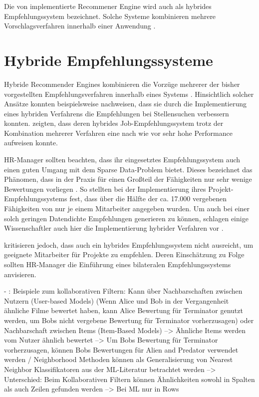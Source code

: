 Die von \textcite[S. 1]{semanticMatchmaking:2009} implementierte Recommener Engine wird auch als hybrides Empfehlungssystem bezeichnet. Solche Systeme kombinieren mehrere Vorschlagsverfahren innerhalb einer Anwendung \cite[S. 8]{malinowski:2008}.

\section{Hybride Empfehlungssysteme}
\label{ch:empfehlungssysteme:hybrideEmpfehlungssysteme}
Hybride Recommender Engines kombinieren die Vorzüge mehrerer der bisher vorgestellten Empfehlungsverfahren innerhalb eines Systems \cite[S. 8]{malinowski:2008}. Hinsichtlich solcher Ansätze konnten beispielsweise \textcite[S. 8]{combiningCbAndCFCostSensitiveApproach:2017} nachweisen, dass sie durch die Implementierung eines hybriden Verfahrens die Empfehlungen bei Stellensuchen verbessern konnten. \textcite[S. 16]{hybridImmunizing:2017} zeigten, dass deren hybrides Job-Empfehlungssystem trotz der Kombination mehrerer Verfahren eine nach wie vor sehr hohe Performance aufweisen konnte.

HR-Manager sollten beachten, dass ihr eingesetztes Empfehlungssystem auch einen guten Umgang mit dem Sparse Data-Problem bietet. Dieses bezeichnet das Phänomen, dass in der Praxis für einen Großteil der Fähigkeiten nur sehr wenige Bewertungen vorliegen \cite[S. 8]{recommenderSystems:2016}. So stellten \textcite[S. 3]{mitre:2014} bei der Implementierung ihres Projekt-Empfehlungssystems fest, dass über die Hälfte der ca. 17.000 vergebenen Fähigkeiten von nur je einem Mitarbeiter angegeben wurden. Um auch bei einer solch geringen Datendichte Empfehlungen generieren zu können, schlagen einige Wissenschaftler auch hier die Implementierung hybrider Verfahren vor \cite[S. 3]{weightedSimilarity:2015}.

\textcite[S. 1]{malinowski:2008} kritisieren jedoch, dass auch ein hybrides Empfehlungssystem nicht ausreicht, um geeignete Mitarbeiter für Projekte zu empfehlen. Deren Einschätzung zu Folge sollten HR-Manager die Einführung eines bilateralen Empfehlungssystems anvisieren.

\newpage
- \cite[S. 33]{recommenderSystems:2016}: Beispiele zum kollaborativen Filtern: Kann über Nachbarschaften zwischen Nutzern (User-based Models) (Wenn Alice und Bob in der Vergangenheit ähnliche Filme bewertet haben, kann Alice Bewertung für Terminator genutzt werden, um Bobs nicht vergebene Bewertung für Terminator vorherzusagen) oder Nachbarschaft zwischen Items (Item-Based Models) --> Ähnliche Items werden vom Nutzer ähnlich bewertet --> Um Bobs Bewertung für Terminator vorherzusagen, können Bobs Bewertungen für Alien and Predator verwendet werden / Neighborhood Methoden können als Generalisierung von Nearest Neighbor Klassifikatoren aus der ML-Literatur betrachtet werden --> Unterschied: Beim Kollaborativen Filtern können Ähnlichkeiten sowohl in Spalten als auch Zeilen gefunden werden --> Bei ML nur in Rows

